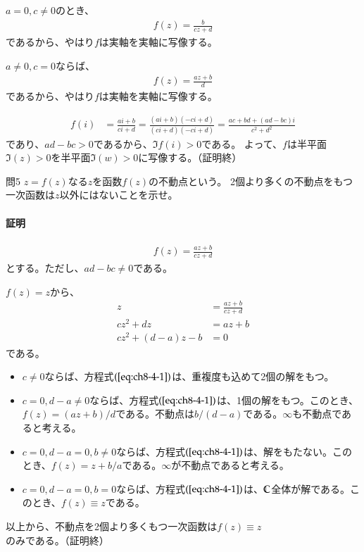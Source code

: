 $a=0,c\neq0$のとき、
\begin{align*}
    f(z)=\frac{b}{cz+d}
\end{align*}
であるから、やはり$f$は実軸を実軸に写像する。

$a\neq0,c=0$ならば、
\begin{align*}
    f(z)=\frac{az+b}{d}
\end{align*}
であるから、やはり$f$は実軸を実軸に写像する。

\begin{align*}
    f(i)&=\frac{ai+b}{ci+d}
    =\frac{(ai+b)(-ci+d)}{(ci+d)(-ci+d)}
    =\frac{ac+bd+(ad-bc)i}{c^2+d^2}
\end{align*}
であり、$ad-bc>0$であるから、$\Im f(i)>0$である。
よって、$f$は半平面$\Im(z)>0$を半平面$\Im(w)>0$に写像する。（証明終）

\newpage
\begin{mysimplebox}{問5}
    $z=f(z)$なる$z$を函数$f(z)$の不動点という。
    2個より多くの不動点をもつ一次函数は$z$以外にはないことを示せ。
\end{mysimplebox}
\paragraph{証明}
\begin{align*}
    f(z)=\frac{az+b}{cz+d}
\end{align*}
とする。ただし、$ad-bc\neq0$である。

$f(z)=z$から、
\begin{align}
    z&=\frac{az+b}{cz+d}\nonumber\\
    cz^2+dz&=az+b\nonumber\\
    cz^2+(d-a)z-b&=0\label{eq:ch8-4-1}
\end{align}
である。
\begin{itemize}
    \item $c\neq0$ならば、方程式$(\ref{eq:ch8-4-1})$は、重複度も込めて2個の解をもつ。
    \item $c=0,d-a\neq0$ならば、方程式$(\ref{eq:ch8-4-1})$は、1個の解をもつ。このとき、$f(z)=(az+b)/d$である。不動点は$b/(d-a)$である。$\infty$も不動点であると考える。
    \item $c=0,d-a=0,b\neq0$ならば、方程式$(\ref{eq:ch8-4-1})$は、解をもたない。このとき、$f(z)=z+b/a$である。$\infty$が不動点であると考える。
    \item $c=0,d-a=0,b=0$ならば、方程式$(\ref{eq:ch8-4-1})$は、$\mathbb{C}$全体が解である。このとき、$f(z)\equiv z$である。
\end{itemize}
以上から、不動点を2個より多くもつ一次函数は$f(z)\equiv z$のみである。（証明終）

